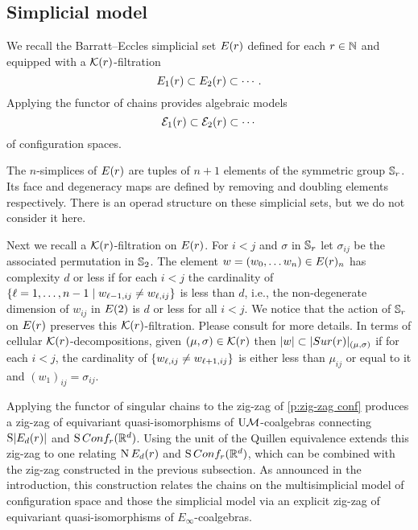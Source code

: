 
\subsection{Simplicial model}\label{ss:simplicial model}

We recall the Barratt--Eccles simplicial set $E(r)$ defined for each $r\in\mathbb{N}$ and equipped with a $\mathcal{K}(r)$-filtration
\[
E_{1}(r) \subset E_{2}(r) \subset \dotsb.
\]
Applying the functor of chains provides algebraic models
\[
\mathcal{E}_{1}(r) \subset \mathcal{E}_{2}(r) \subset \dotsb
\]
of configuration spaces.

The $n$-simplices of $E(r)$ are tuples of $n+1$ elements of the symmetric group $\mathbb{S}_r$.
Its face and degeneracy maps are defined by removing and doubling elements respectively.
There is an operad structure on these simplicial sets, but we do not consider it here.

Next we recall a $\mathcal{K}(r)$-filtration on $E(r)$.
For $i<j$ and $\sigma$ in $\mathbb{S}_r$ let $\sigma_{ij}$ be the associated permutation in $\mathbb{S}_2$.
The element $w = (w_0,\dots w_n) \in E(r)_n$ has complexity $d$ or less if for each $i<j$ the cardinality of $\{\ell=1,\dots,n-1 \mid w_{\ell-1,ij} \neq w_{\ell,ij}\}$ is less than $d$, i.e., the non-degenerate dimension of $w_{ij}$ in $E(2)$ is $d$ or less for all $i<j$.
We notice that the action of $\mathbb{S}_r$ on $E(r)$ preserves this $\mathcal{K}(r)$-filtration.
Please consult \cite{smith1989filtration,kashiwabara1993confcomplex,berger1997confspacemodel} for more details.
In terms of cellular $\mathcal{K}(r)$-decompositions, given $(\mu,\sigma) \in \mathcal{K}(r)$ then $\lvert w\rvert \subset \lvert Sur(r)\rvert_{(\mu,\sigma)}$ if for each $i<j$, the cardinality of $\{w_{\ell,ij} \neq w_{\ell+1,ij}\}$ is either less than $\mu_{ij}$ or equal to it and $(w_1)_{ij} = \sigma_{ij}$.

Applying the functor of singular chains to the zig-zag of \cref{p:zig-zag conf} produces a zig-zag of equivariant quasi-isomorphisms of $\mathrm{U}\mathcal{M}$-coalgebras connecting $\operatorname{S}\lvert E_d(r)\rvert$ and $\operatorname{S}Conf_{r}(\mathbb{R}^{d})$.
Using the unit of the Quillen equivalence extends this zig-zag to one relating $\operatorname{N}E_d(r)$ and $\operatorname{S}Conf_{r}(\mathbb{R}^{d})$, which can be combined with the zig-zag constructed in the previous subsection.
As announced in the introduction, this construction relates the chains on the multisimplicial model of configuration space and those the simplicial model via an explicit zig-zag of equivariant quasi-isomorphisms of $E_\infty$-coalgebras.

